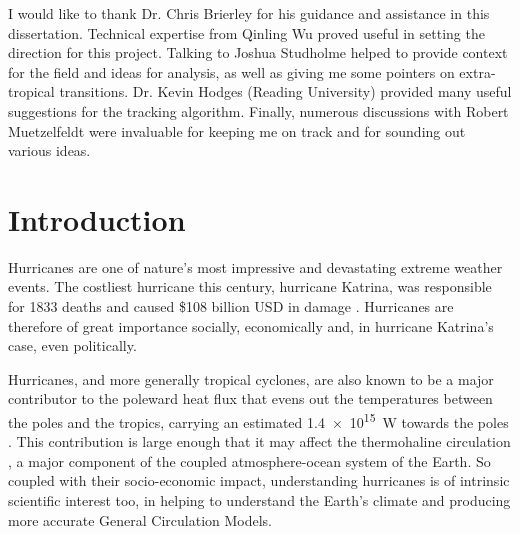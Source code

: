 \documentclass[pdftex,12pt,a4paper]{report}
\begin{document}
I would like to thank Dr. Chris Brierley for his guidance and assistance in this dissertation.
Technical expertise from Qinling Wu proved useful in setting the direction for this project.
Talking to Joshua Studholme helped to provide context for the field and ideas for analysis, as well
as giving me some pointers on extra-tropical transitions. %
Dr. Kevin Hodges (Reading University) provided many useful suggestions for the tracking algorithm.
Finally, numerous discussions with Robert Muetzelfeldt were invaluable for keeping me on track and
for sounding out various ideas.

\newpage

\tableofcontents

\chapter{Introduction}


Hurricanes are one of nature's most impressive and devastating extreme weather events. The costliest
hurricane this century, hurricane Katrina, was responsible for 1833 deaths and caused \$108
billion USD in damage \parencite{TODOCITE}. Hurricanes are therefore of great importance socially,
economically and, in hurricane Katrina's case, even politically.

Hurricanes, and more generally tropical cyclones, are also known to be a major contributor to the
poleward heat flux that evens out the temperatures between the poles and the tropics, carrying an
estimated \SI{1.4e15}{W} towards the poles \parencite{emanuelContribution2012}. This
contribution is large enough that it may affect the thermohaline circulation
\parencite{huEffect2009}, a major component of the coupled atmosphere-ocean system of the Earth. So
coupled with their socio-economic impact, understanding hurricanes is of intrinsic scientific
interest too, in helping to understand the Earth's climate and producing more accurate General
Circulation Models.
\end{document}

